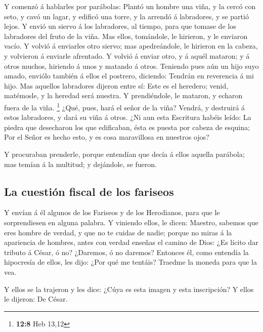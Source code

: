  Y comenzó á hablarles por parábolas: Plantó un hombre una
viña, y la cercó con seto, y cavó un lagar, y edificó una torre, y la
arrendó á labradores, y se partió lejos.  Y envió un
siervo á los labradores, al tiempo, para que tomase de los labradores
del fruto de la viña.  Mas ellos, tomándole, le hirieron,
y le enviaron vacío.  Y volvió á enviarles otro siervo;
mas apedreándole, le hirieron en la cabeza, y volvieron á enviarle
afrentado.  Y volvió á enviar otro, y á aquél mataron; y á
otros muchos, hiriendo á unos y matando á otros.  Teniendo
pues aún un hijo suyo amado, enviólo también á ellos el postrero,
diciendo: Tendrán en reverencia á mi hijo.  Mas aquellos
labradores dijeron entre sí: Este es el heredero; venid, matémosle, y la
heredad será nuestra.  Y prendiéndole, le mataron, y
echaron fuera de la viña. \footnote{\textbf{12:8} Heb 13,12}
 ¿Qué, pues, hará el señor de la viña? Vendrá, y destruirá
á estos labradores, y dará su viña á otros.  ¿Ni aun esta
Escritura habéis leído: La piedra que desecharon los que edificaban,
ésta es puesta por cabeza de esquina;  Por el Señor es
hecho esto, y es cosa maravillosa en nuestros ojos?

 Y procuraban prenderle, porque entendían que decía á
ellos aquella parábola; mas temían á la multitud; y dejándole, se
fueron.

\hypertarget{la-cuestiuxf3n-fiscal-de-los-fariseos}{%
\subsection{La cuestión fiscal de los
fariseos}\label{la-cuestiuxf3n-fiscal-de-los-fariseos}}

 Y envían á él algunos de los Fariseos y de los
Herodianos, para que le sorprendiesen en alguna palabra. 
Y viniendo ellos, le dicen: Maestro, sabemos que eres hombre de verdad,
y que no te cuidas de nadie; porque no miras á la apariencia de hombres,
antes con verdad enseñas el camino de Dios: ¿Es lícito dar tributo á
César, ó no? ¿Daremos, ó no daremos?  Entonces él, como
entendía la hipocresía de ellos, les dijo: ¿Por qué me tentáis? Traedme
la moneda para que la vea.

 Y ellos se la trajeron y les dice: ¿Cúya es esta imagen
y esta inscripción? Y ellos le dijeron: De César.

